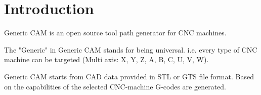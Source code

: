 \section{Introduction}

Generic CAM is an open source tool path generator for CNC machines.


The "Generic" in Generic CAM stands for being universal. i.e. every
type of CNC machine can be targeted (Multi axis: X, Y, Z, A, B, C,
U, V, W).


Generic CAM starts from CAD data provided in STL or GTS file format.
Based on the capabilities of the selected CNC-machine G-codes are
generated.
 